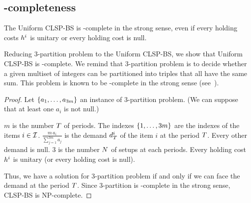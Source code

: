 \subsection{\NP-completeness}


\begin{thm}
  The Uniform CLSP-BS is \NP-complete in the strong sense, even if every holding costs $h^i$ is unitary or every holding cost is null.
\end{thm}





Reducing 3-partition problem to the Uniform CLSP-BS, we show that Uniform CLSP-BS is \NP-complete. We remind that 3-partition problem is to decide whether a given multiset of integers can be partitioned into triples that all have the same sum. This problem is known to be \NP-complete in the strong sense (see~\cite{Garey1979}).



\begin{proof}
Let $\crbracket{a_1,\ldots,a_{3m}}$ an instance of 3-partition problem. (We can suppose that at least one $a_i$ is not null.)

$m$ is the number $T$ of periods.
The indexes $\crbracket{1,\ldots,3m}$ are the indexes of the items $i\in\mathcal{I}$.
$\frac{m\,a_i}{\sum_{j=1}^{3m}a_j}$ is the demand $d_{T}^i$ of the item $i$ at the period $T$. Every other demand is null.
3 is the number $N$ of setups at each periods.
Every holding cost $h^i$ is unitary (or every holding cost is null).

Thus, we have a solution for 3-partition problem if and only if we can face the demand at the period $T$. Since 3-partition is \NP-complete in the strong sense, CLSP-BS is NP-complete.
\end{proof}


